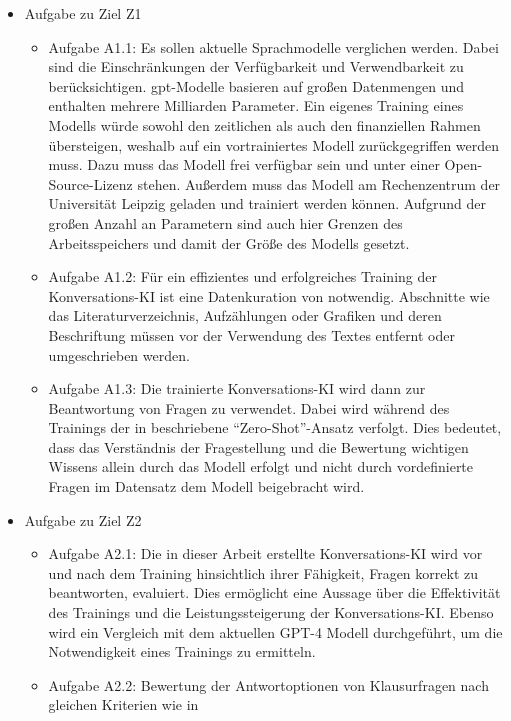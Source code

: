 \begin{itemize}
  \item Aufgabe zu Ziel Z1
  \begin{itemize}
    \item Aufgabe A1.1: Es sollen aktuelle Sprachmodelle verglichen werden. Dabei sind die Einschränkungen der Verfügbarkeit und Verwendbarkeit zu berücksichtigen.
    \ac{gpt}-Modelle basieren auf großen Datenmengen und enthalten mehrere Milliarden Parameter.
    Ein eigenes Training eines Modells würde sowohl den zeitlichen als auch den finanziellen Rahmen übersteigen, weshalb auf ein vortrainiertes Modell zurückgegriffen werden muss.
    Dazu muss das Modell frei verfügbar sein und unter einer Open-Source-Lizenz stehen. Außerdem muss das Modell am Rechenzentrum der Universität Leipzig geladen und trainiert werden können. Aufgrund der großen Anzahl an Parametern sind auch hier Grenzen des Arbeitsspeichers und damit der Größe des Modells gesetzt.
    \item Aufgabe A1.2: Für ein effizientes und erfolgreiches Training der Konversations-KI ist eine Datenkuration von \citet{bb} notwendig.
    Abschnitte wie das Literaturverzeichnis, Aufzählungen oder Grafiken und deren Beschriftung müssen vor der Verwendung des Textes entfernt oder umgeschrieben werden.
    \item Aufgabe A1.3: Die trainierte Konversations-KI wird dann zur Beantwortung von Fragen zu \citet{bb} verwendet.
    Dabei wird während des Trainings der in \citet{gpt3} beschriebene \enquote{Zero-Shot}-Ansatz verfolgt.
    Dies bedeutet, dass das Verständnis der Fragestellung und die Bewertung wichtigen Wissens allein durch das Modell erfolgt und nicht durch vordefinierte Fragen im Datensatz dem Modell beigebracht wird.
  \end{itemize}
  \item Aufgabe zu Ziel Z2
  \begin{itemize}
    \item Aufgabe A2.1: Die in dieser Arbeit erstellte Konversations-KI wird vor und nach dem Training hinsichtlich ihrer Fähigkeit, Fragen korrekt zu beantworten, evaluiert.
    Dies ermöglicht eine Aussage über die Effektivität des Trainings und die Leistungssteigerung der Konversations-KI.\@
    Ebenso wird ein Vergleich mit dem aktuellen GPT-4 Modell \citep{gpt4} durchgeführt, um die Notwendigkeit eines Trainings zu ermitteln.
    \item Aufgabe A2.2: Bewertung der Antwortoptionen von Klausurfragen nach gleichen Kriterien wie in \citet{chatgpt_qas}
  \end{itemize}
\end{itemize}

